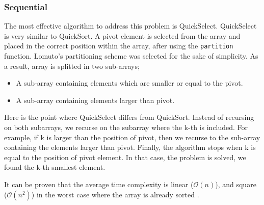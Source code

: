 \documentclass[11pt]{article}
\begin{document}
\subsubsection{Sequential}
\label{sec:org00dbb74}
The most effective algorithm to address this problem is QuickSelect. QuickSelect is very similar to QuickSort. A pivot element is selected from the array and placed in the correct position within the array, after using the \texttt{partition} function. Lomuto's partitioning scheme was selected for the sake of simplicity. As a result, array is splitted in two sub-arrays;
\begin{itemize}
\item A sub-array containing elements which are smaller or equal to the pivot.
\item A sub-array containing elements larger than pivot.
\end{itemize}
Here is the point where QuickSelect differs from QuickSort. Instead of recursing on both subarrays, we recurse on the subarray where the k-th is included. For example, if k is larger than the position of pivot, then we recurse to the sub-array containing the elements larger than pivot. Finally, the algorithm stops when k is equal to the position of pivot element. In that case, the problem is solved, we found the k-th smallest element.

It can be proven that the average time complexity is linear (\(\mathcal{O}(n)\)), and square (\(\mathcal{O}(n^{2})\)) in the worst case where the array is already sorted \autocite{quickselect}.
\end{document}
